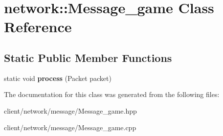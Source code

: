 \hypertarget{classnetwork_1_1_message__game}{\section{network\-:\-:Message\-\_\-game Class Reference}
\label{classnetwork_1_1_message__game}
}
\subsection*{Static Public Member Functions}
\begin{DoxyCompactItemize}
\item 
\hypertarget{classnetwork_1_1_message__game_a86666dd9bbe81e7d7c508c1b5115fb04}{static void {\bfseries process} (Packet packet)}\label{classnetwork_1_1_message__game_a86666dd9bbe81e7d7c508c1b5115fb04}

\end{DoxyCompactItemize}


The documentation for this class was generated from the following files\-:\begin{DoxyCompactItemize}
\item 
client/network/message/Message\-\_\-game.\-hpp\item 
client/network/message/Message\-\_\-game.\-cpp\end{DoxyCompactItemize}
